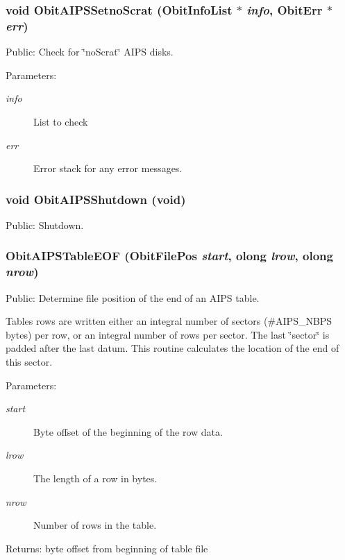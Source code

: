 \subsubsection{\setlength{\rightskip}{0pt plus 5cm}void Obit\-AIPSSetno\-Scrat ({\bf Obit\-Info\-List} $\ast$ {\em info}, {\bf Obit\-Err} $\ast$ {\em err})}\label{ObitAIPS_8h_a29}


Public: Check for \char`\"{}no\-Scrat\char`\"{} AIPS disks. 

\begin{Desc}
\item[Parameters:]
\begin{description}
\item[{\em info}]List to check \item[{\em err}]Error stack for any error messages. \end{description}
\end{Desc}
\subsubsection{\setlength{\rightskip}{0pt plus 5cm}void Obit\-AIPSShutdown (void)}\label{ObitAIPS_8h_a12}


Public: Shutdown. 

\subsubsection{ Obit\-AIPSTable\-EOF ({\bf Obit\-File\-Pos} {\em start}, {\bf olong} {\em lrow}, {\bf olong} {\em nrow})}\label{ObitAIPS_8h_a20}


Public: Determine file position of the end of an AIPS table. 

Tables rows are written either an integral number of sectors (\#AIPS\_\-NBPS bytes) per row, or an integral number of rows per sector. The last \char`\"{}sector\char`\"{} is padded after the last datum. This routine calculates the location of the end of this sector. \begin{Desc}
\item[Parameters:]
\begin{description}
\item[{\em start}]Byte offset of the beginning of the row data. \item[{\em lrow}]The length of a row in bytes. \item[{\em nrow}]Number of rows in the table. \end{description}
\end{Desc}
\begin{Desc}
\item[Returns:]byte offset from beginning of table file \end{Desc}
